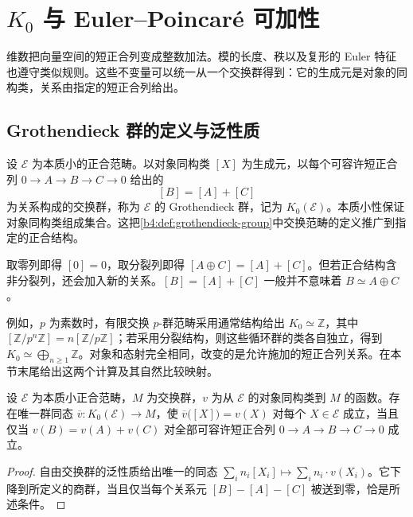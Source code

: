 
\section{\texorpdfstring{\(K_0\) 与 Euler–Poincaré 可加性}{K0 与 Euler–Poincaré 可加性}}
\label{b4:sec:B02}

维数把向量空间的短正合列变成整数加法。模的长度、秩以及复形的 Euler 特征也遵守类似规则。这些不变量可以统一从一个交换群得到：它的生成元是对象的同构类，关系由指定的短正合列给出。

\subsection{Grothendieck 群的定义与泛性质}
\label{b4:subsec:B02:01}

\begin{definition}\label{b4:def:B-grothendieck-group}
	设 \(\mathcal E\) 为本质小的正合范畴。以对象同构类 \([X]\) 为生成元，以每个可容许短正合列 \(0\rightarrow A\rightarrow B\rightarrow C\rightarrow0\) 给出的
	\[
		[B]=[A]+[C]
	\]
	为关系构成的交换群，称为 \(\mathcal E\) 的 Grothendieck 群，记为 \(K_0(\mathcal E)\)。本质小性保证对象同构类组成集合。这把\cref{b4:def:grothendieck-group}中交换范畴的定义推广到指定的正合结构。
\end{definition}

取零列即得 \([0]=0\)，取分裂列即得 \([A\oplus C]=[A]+[C]\)。但若正合结构含非分裂列，还会加入新的关系。\([B]=[A]+[C]\) 一般并不意味着 \(B\simeq A\oplus C\)。

\ProseParagraphBreak
例如，\(p\) 为素数时，有限交换 \(p\)-群范畴采用通常结构给出 \(K_0\simeq\mathbb Z\)，其中 \([\mathbb Z/p^n\mathbb Z]=n[\mathbb Z/p\mathbb Z]\)；若采用分裂结构，则这些循环群的类各自独立，得到 \(K_0\simeq\bigoplus_{n\ge1}\mathbb Z\)。对象和态射完全相同，改变的是允许施加的短正合列关系。在本节末尾给出这两个计算及其自然比较映射。

\begin{proposition}[可加不变量的泛性质]\label{b4:prop:B-k0-universal}
	设 \(\mathcal E\) 为本质小正合范畴，\(M\) 为交换群，\(v\) 为从 \(\mathcal E\) 的对象同构类到 \(M\) 的函数。存在唯一群同态 \(\overline v:K_0(\mathcal E)\rightarrow M\)，使 \(\overline v\bigl([X]\bigr)=v(X)\) 对每个 \(X\in\mathcal E\) 成立，当且仅当 \(v(B)=v(A)+v(C)\) 对全部可容许短正合列 \(0\to A\to B\to C\to0\) 成立。
\end{proposition}
\begin{proof}
	自由交换群的泛性质给出唯一的同态 \(\sum_i n_i[X_i]\mapsto\sum_i n_i\cdot v(X_i)\)。它下降到所定义的商群，当且仅当每个关系元 \([B]-[A]-[C]\) 被送到零，恰是所述条件。
\end{proof}

